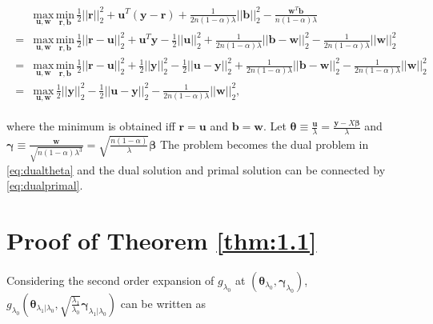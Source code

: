 \begin{gather}
    \label{eq:dualuw}
    \begin{aligned}
        &\underset{\boldsymbol u,\boldsymbol w}{\mathrm{max}}\,\underset{\boldsymbol r,\boldsymbol b}{\mathrm{min}}\,\frac{1}{2}||\boldsymbol r||_2^2+\boldsymbol u^T(\boldsymbol y-\boldsymbol r)+\frac{1}{2n(1-\alpha)\lambda}||\boldsymbol b||_2^2-\frac{\boldsymbol w^T\boldsymbol b}{n(1-\alpha)\lambda}\\
        =&\underset{\boldsymbol u,\boldsymbol w}{\mathrm{max}}\,\underset{\boldsymbol r,\boldsymbol b}{\mathrm{min}}\,\frac{1}{2}||\boldsymbol r-\boldsymbol u||_2^2+\boldsymbol u^T\boldsymbol y-\frac{1}{2}||\boldsymbol u||_2^2+\frac{1}{2n(1-\alpha)\lambda}||\boldsymbol b-\boldsymbol w||_2^2-\frac{1}{2n(1-\alpha)\lambda}||\boldsymbol w||_2^2\\
        =&\underset{\boldsymbol u,\boldsymbol w}{\mathrm{max}}\,\underset{\boldsymbol r,\boldsymbol b}{\mathrm{min}}\,\frac{1}{2}||\boldsymbol r-\boldsymbol u||_2^2+\frac{1}{2}||\boldsymbol y||_2^2-\frac{1}{2}||\boldsymbol u-\boldsymbol y||_2^2+\frac{1}{2n(1-\alpha)\lambda}||\boldsymbol b-\boldsymbol w||_2^2-\frac{1}{2n(1-\alpha)\lambda}||\boldsymbol w||_2^2\\
        =&\underset{\boldsymbol u,\boldsymbol w}{\mathrm{max}}\,\frac{1}{2}||\boldsymbol y||_2^2-\frac{1}{2}||\boldsymbol u-\boldsymbol y||_2^2-\frac{1}{2n(1-\alpha)\lambda}||\boldsymbol w||_2^2,
    \end{aligned}
\end{gather}

where the minimum is obtained iff $\boldsymbol r=\boldsymbol u$ and $\boldsymbol b=\boldsymbol w$. Let $\boldsymbol\theta\equiv\frac{\boldsymbol u}{\lambda}=\frac{\boldsymbol y-X\boldsymbol\beta}{\lambda}$ and $\boldsymbol\gamma\equiv\frac{\boldsymbol w}{\sqrt{n(1-\alpha)\lambda^3}}=\sqrt{\frac{n(1-\alpha)}{\lambda}}\boldsymbol\beta$ The problem becomes the dual problem in \eqref{eq:dualtheta} and the dual solution and primal solution can be connected by \eqref{eq:dualprimal}.

\section{Proof of Theorem \ref{thm:1.1}}


Considering the second order expansion of $g_{\lambda_0}$ at $(\boldsymbol\theta_{\lambda_0},\boldsymbol\gamma_{\lambda_0})$, $g_{\lambda_0}\left(\boldsymbol\theta_{\lambda_1|\lambda_0},\sqrt{\frac{\lambda_1}{\lambda_0}}\boldsymbol\gamma_{\lambda_1|\lambda_0}\right)$ can be written as

